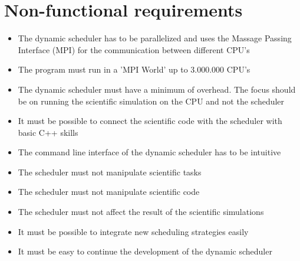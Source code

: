 {
\setcounter{funcNFR}{10}
\renewcommand{\labelitemi}{
	\ifnum \value{funcNFR}<10$/NF 0\arabic{funcNFR} /$\addtocounter{funcNFR}{10}
	\else $/NF \arabic{funcNFR} /$\addtocounter{funcNFR}{10}\fi
}

\section{Non-functional requirements}
	\begin{itemize}
		\item The dynamic scheduler has to be parallelized and uses the Massage Passing Interface (MPI) for the communication between different CPU's
		\item The program must run in a 'MPI World' up to 3.000.000 CPU's
		\item The dynamic scheduler must have a minimum of overhead. The focus should be on running the scientific simulation on the CPU and not the scheduler
		\item It must be possible to connect the scientific code with the scheduler with basic C++ skills
		\item The command line interface of the dynamic scheduler has to be intuitive
		\item The scheduler must not manipulate scientific tasks
		\item The scheduler must not manipulate scientific code
		\item The scheduler must not affect the result of the scientific simulations
		\item It must be possible to integrate new scheduling strategies easily
		\item It must be easy to continue the development of the dynamic scheduler
	\end{itemize}
}
